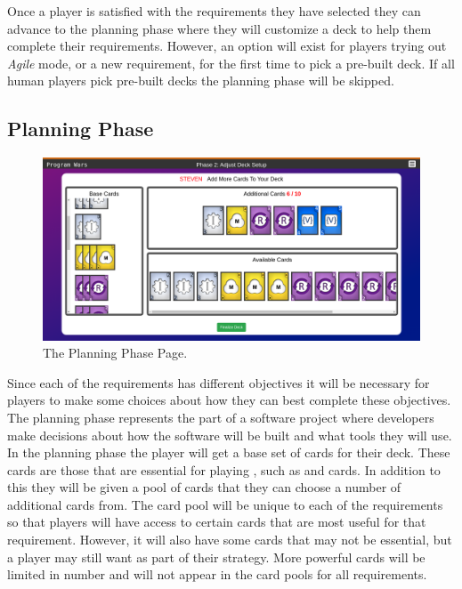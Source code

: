 Once a player is satisfied with the requirements they have selected they can advance to
the planning phase where they will customize a deck to help them complete their
requirements. However, an option will exist for players trying out \emph{Agile} mode,
or a new requirement, for the first time to pick a pre-built deck. If all human
players pick pre-built decks the planning phase will be skipped.

\subsection{Planning Phase}

\begin{figure}[ht]
	\centering
	\includegraphics[width=\textwidth]{images/deck_setup_screen.PNG}
	\caption{The Planning Phase Page.}
	\label{fig:deckSetup}
\end{figure}

Since each of the requirements has different objectives it will be necessary for
players to make some choices about how they can best complete these objectives.
The planning phase represents the part of a software project where developers
make decisions about how the software will be built and what tools they will use.
In the planning phase the player will get a base set of cards for their deck. These
cards are those that are essential for playing \gameNameNS, such as \I and \R cards.
In addition to this they will be given a pool of cards that they can choose a number
of additional cards from. The card pool will be unique to each of the requirements
so that players will have access to certain cards that are most useful for that
requirement. However, it will also have some cards that may not be essential, but
a player may still want as part of their strategy. More powerful cards will be
limited in number and will not appear in the card pools for all requirements.


